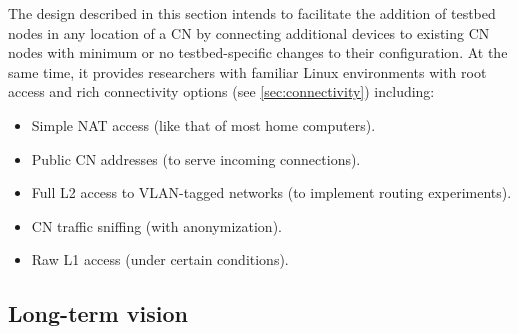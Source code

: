 \documentclass[conference]{IEEEtran}
\begin{document}


The design described in this section intends to facilitate the addition of
testbed nodes in any location of a CN by connecting additional devices to
existing CN nodes with minimum or no testbed-specific changes to their
configuration.  At the same time, it provides researchers with familiar
Linux environments with root access and rich connectivity
options (see \ref{sec:connectivity}) including:

\begin{itemize}
\item Simple NAT access (like that of most home computers).
\item Public CN addresses (to serve incoming connections).
\item Full L2 access to VLAN-tagged networks (to implement routing
  experiments).
\item CN traffic sniffing (with anonymization).
\item Raw L1 access (under certain conditions).
\end{itemize}

\subsection{Long-term vision}
\end{document}
